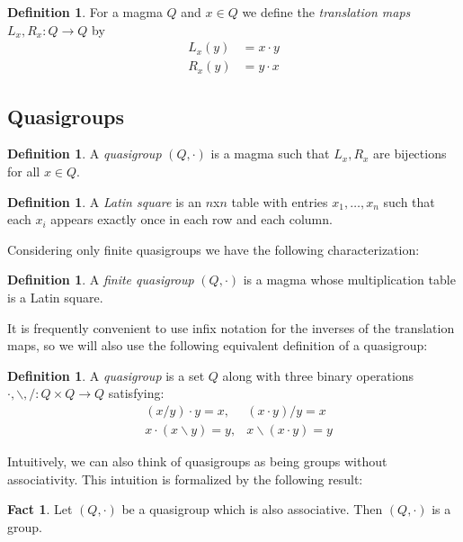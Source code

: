 \documentclass[12pt, twoside, openright]{report}
\theoremstyle{definition}
\newtheorem{fct}[thm]{Fact}
\newtheorem{dfn}[thm]{Definition}
\newcommand{\ldv}{\backslash}       %
\newcommand{\rdv}{/}                %
\begin{document}
\begin{dfn}
  For a magma $Q$ and $x\in Q$ we define the \emph{translation maps} $L_x, R_x:Q\to Q$ by
  \begin{align*}
    L_x(y) &= x\cdot y\\
    R_x(y) &= y\cdot x
  \end{align*}
\end{dfn}

\subsection{Quasigroups}

\begin{dfn}
  A \emph{quasigroup} $(Q, \cdot)$ is a magma such that $L_x, R_x$ are bijections for all $x\in Q$.
\end{dfn}

\begin{dfn}
  A \emph{Latin square} is an $n$x$n$ table with entries $x_1, \ldots, x_n$ such that each $x_i$ appears exactly once
    in each row and each column.
\end{dfn}

Considering only finite quasigroups we have the following characterization:

\begin{dfn}
  A \emph{finite quasigroup} $(Q, \cdot)$ is a magma whose multiplication table is a Latin square.
\end{dfn}

It is frequently convenient to use infix notation for the inverses of the translation maps, so we will also use the
  following equivalent definition of a quasigroup:

\begin{dfn}
  A \emph{quasigroup} is a set $Q$ along with three binary operations $\cdot, \ldv, \rdv:Q\times Q\to Q$ satisfying:
  \begin{align*}
    &(x\rdv y)\cdot y = x, &(x\cdot y)\rdv y = x\\
    &x\cdot (x\ldv y) = y, &x\ldv (x\cdot y) = y
  \end{align*}
\end{dfn}

Intuitively, we can also think of quasigroups as being groups without associativity. This intuition is formalized by
  the following result:

\begin{fct}
  Let $(Q, \cdot)$ be a quasigroup which is also associative. Then $(Q, \cdot)$ is a group.
\end{fct}
\end{document}
